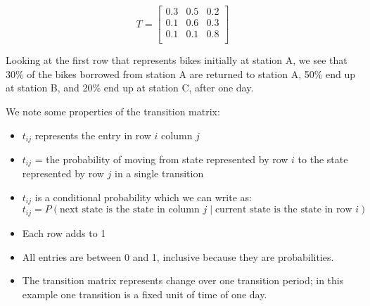 \[
    T = \begin{bmatrix}
        0.3 & 0.5 & 0.2 \\
        0.1 & 0.6 & 0.3 \\
        0.1 & 0.1 & 0.8 \\
    \end{bmatrix}
\]

Looking at the first row that represents bikes initially at station A, we see that 30\% of the bikes borrowed from station A are returned to station A, 50\% end up at station B, and 20\% end up at station C, after one day.

We note some properties of the transition matrix:
\begin{itemize}
    \item \( t_{ij} \) represents the entry in row \( i \) column \( j \)
    \item \( t_{ij} \) = the probability of moving from state represented by row \( i \) to the state represented by row \( j \) in a single transition
    \item \( t_{ij} \) is a conditional probability which we can write as:
          \[ t_{ij} = P(\text{next state is the state in column } j \mid\text{current state is the state in row } i) \]
    \item Each row adds to 1
    \item All entries are between 0 and 1, inclusive because they are probabilities.
    \item The transition matrix represents change over one transition period; in this example one transition is a fixed unit of time of one day.
\end{itemize}

